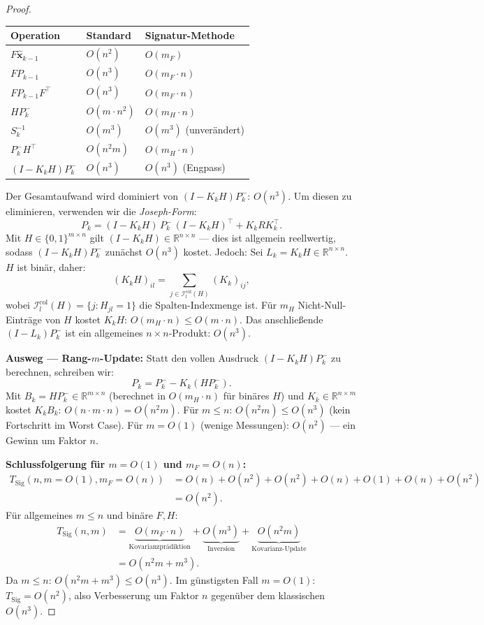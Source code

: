 ﻿\documentclass[a4paper,12pt]{article}
\theoremstyle{definition}
\begin{document}
\begin{proof}
\begin{center}
\begin{tabular}{lll}
\toprule
Operation & Standard & Signatur-Methode \\
\midrule
$F\hat{\mathbf{x}}_{k-1}$ & $O(n^2)$ & $O(m_F)$ \\
$FP_{k-1}$ & $O(n^3)$ & $O(m_F \cdot n)$ \\
$FP_{k-1}F^\top$ & $O(n^3)$ & $O(m_F \cdot n)$ \\
$HP_k^-$ & $O(m \cdot n^2)$ & $O(m_H \cdot n)$ \\
$S_k^{-1}$ & $O(m^3)$ & $O(m^3)$ (unverändert) \\
$P_k^- H^\top$ & $O(n^2 m)$ & $O(m_H \cdot n)$ \\
$(I-K_kH)P_k^-$ & $O(n^3)$ & $O(n^3)$ (Engpass) \\
\bottomrule
\end{tabular}
\end{center}

Der Gesamtaufwand wird dominiert von $(I - K_k H)P_k^-$: $O(n^3)$.
Um diesen zu eliminieren, verwenden wir die \emph{Joseph-Form}:
\[
    P_k = (I - K_k H)\,P_k^-\,(I-K_kH)^\top + K_k R K_k^\top.
\]
Mit $H \in \{0,1\}^{m\times n}$ gilt $(I - K_k H) \in \mathbb{R}^{n\times n}$ ---
dies ist allgemein reellwertig, sodass $(I-K_kH)P_k^-$ zunächst $O(n^3)$ kostet.
Jedoch: Sei $L_k = K_k H \in \mathbb{R}^{n\times n}$.
$H$ ist binär, daher:
\[
    (K_k H)_{il} = \sum_{j \in \mathcal{I}_l^{\text{col}}(H)} (K_k)_{ij},
\]
wobei $\mathcal{I}_l^{\text{col}}(H) = \{j : H_{jl}=1\}$ die Spalten-Indexmenge ist.
Für $m_H$ Nicht-Null-Einträge von $H$ kostet $K_k H$:
$O(m_H \cdot n) \leq O(m \cdot n)$.
Das anschließende $(I - L_k)P_k^-$ ist ein allgemeines $n\times n$-Produkt: $O(n^3)$.

\medskip
\textbf{Ausweg --- Rang-$m$-Update:}
Statt den vollen Ausdruck $(I - K_k H)P_k^-$ zu berechnen, schreiben wir:
\[
    P_k = P_k^- - K_k(HP_k^-).
\]
Mit $B_k = HP_k^- \in \mathbb{R}^{m\times n}$ (berechnet in $O(m_H \cdot n)$ für
binäres $H$) und $K_k \in \mathbb{R}^{n\times m}$ kostet $K_k B_k$:
$O(n \cdot m \cdot n) = O(n^2 m)$.
Für $m \leq n$: $O(n^2 m) \leq O(n^3)$ (kein Fortschritt im Worst Case).
Für $m = O(1)$ (wenige Messungen): $O(n^2)$ --- ein Gewinn um Faktor $n$.

\medskip
\textbf{Schlussfolgerung für $m = O(1)$ und $m_F = O(n)$:}
\begin{align*}
    T_{\mathrm{Sig}}(n, m=O(1), m_F=O(n))
    &= O(n) + O(n^2) + O(n^2) + O(n) + O(1) + O(n) + O(n^2) \\
    &= O(n^2).
\end{align*}
Für allgemeines $m \leq n$ und binäre $F, H$:
\begin{align*}
    T_{\mathrm{Sig}}(n, m)
    &= \underbrace{O(m_F \cdot n)}_{\text{Kovarianzprädiktion}}
     + \underbrace{O(m^3)}_{\text{Inversion}}
     + \underbrace{O(n^2 m)}_{\text{Kovarianz-Update}} \\
    &= O(n^2 m + m^3).
\end{align*}
Da $m \leq n$: $O(n^2 m + m^3) \leq O(n^3)$.
Im günstigsten Fall $m = O(1)$: $T_{\mathrm{Sig}} = O(n^2)$, also Verbesserung
um Faktor $n$ gegenüber dem klassischen $O(n^3)$.
\end{proof}
\end{document}
